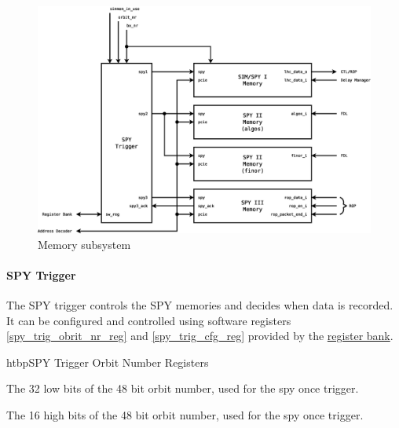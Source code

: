 \begin{figure}[h]
\includegraphics[width=1.0\textwidth]{./figures/simspy}
\caption{Memory subsystem}
\label{fig_simspy}
\end{figure}

\paragraph{SPY Trigger}\label{sec:spy_trigger}
The SPY trigger controls the SPY memories and decides when data is recorded. It can be configured and controlled using 
software registers \ref{spy_trig_obrit_nr_reg} and \ref{spy_trig_cfg_reg} provided by the \hyperref[sec_rb]{register bank}.

\begin{register}{htbp}{SPY Trigger Orbit Number Registers}{}%
	\label{spy_trig_obrit_nr_reg}
	\begin{regdesc}
	\begin{reglist}
		\item [orbit\_nr\_low] The 32 low bits of the 48 bit orbit number, used for the spy once trigger.
		\item [orbit\_nr\_high] The 16 high bits of the 48 bit orbit number, used for the spy once trigger.
	\end{reglist}
	\end{regdesc}
\end{register}

